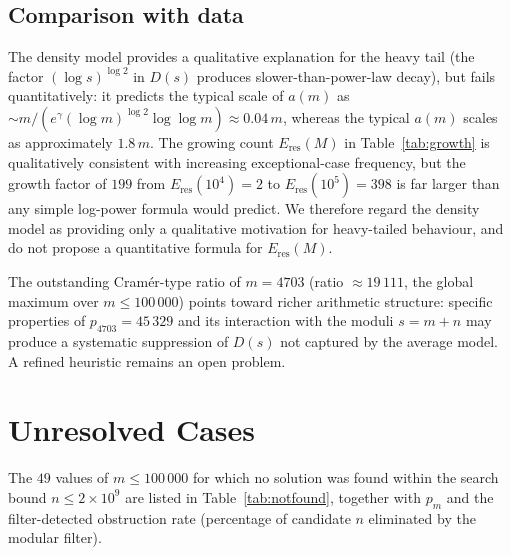 \documentclass[12pt]{article}
\begin{document}
	\subsection{Comparison with data}
	
	The density model provides a qualitative explanation for the heavy tail
	(the factor $(\log s)^{\log 2}$ in $D(s)$ produces slower-than-power-law
	decay), but fails quantitatively: it predicts the typical scale of
	$a(m)$ as $\sim m/(e^{\gamma} (\log m)^{\log 2} \log\log m)
	\approx 0.04\,m$, whereas the typical $a(m)$ scales as
	approximately $1.8\,m$.
	The growing count $E_{\mathrm{res}}(M)$ in Table~\ref{tab:growth} is
	qualitatively consistent with increasing exceptional-case frequency,
	but the growth factor of $199$ from $E_{\mathrm{res}}(10^4) = 2$ to
	$E_{\mathrm{res}}(10^5) = 398$ is far larger than any simple log-power
	formula would predict.
	We therefore regard the density model as providing only a qualitative
	motivation for heavy-tailed behaviour, and do not propose a
	quantitative formula for $E_{\mathrm{res}}(M)$.
	
	The outstanding Cram\'er-type ratio of $m = 4703$ (ratio $\approx 19\,111$,
	the global maximum over $m \leq 100\,000$) points toward richer arithmetic
	structure: specific properties of $p_{4703} = 45\,329$ and its
	interaction with the moduli $s = m+n$ may produce a systematic
	suppression of $D(s)$ not captured by the average model.
	A refined heuristic remains an open problem.
	
	\section{Unresolved Cases}
	\label{sec:notfound}
	
	The $49$ values of $m \leq 100\,000$ for which no solution was found
	within the search bound $n \leq 2 \times 10^9$ are listed in
	Table~\ref{tab:notfound}, together with $p_m$ and the filter-detected
	obstruction rate (percentage of candidate $n$ eliminated by the
	modular filter).
	
\end{document}
